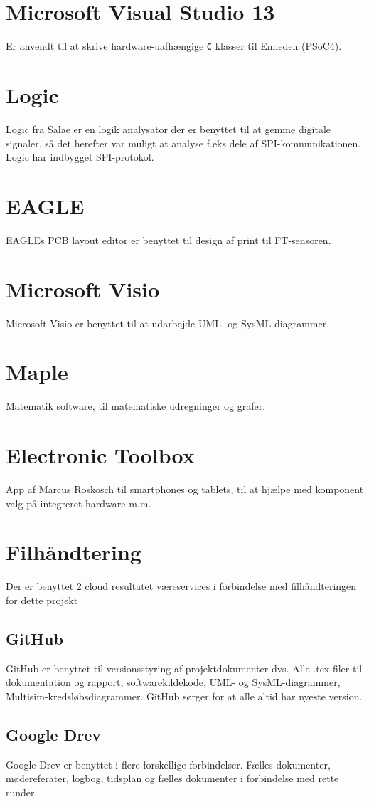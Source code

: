 \section{Microsoft Visual Studio 13}
Er anvendt til at skrive hardware-uafhængige \verb+C+ klasser til Enheden (PSoC4).

\section{Logic}
Logic fra Salae er en logik analysator der er benyttet til at gemme digitale signaler, så det herefter var muligt at analyse f.eks dele af SPI-kommunikationen. Logic har indbygget SPI-protokol.

\section{EAGLE}
EAGLEs PCB layout editor er benyttet til design af print til FT-sensoren.

\section{Microsoft Visio}
Microsoft Visio er benyttet til at udarbejde UML- og SysML-diagrammer. 

\section{Maple}
Matematik software, til matematiske udregninger og grafer.

\section{Electronic Toolbox}
App af Marcus Roskosch til smartphones og tablets, til at hjælpe med komponent valg på integreret hardware m.m. 

\section{Filhåndtering}
Der er benyttet 2 cloud resultatet væreservices i forbindelse med filhåndteringen for dette projekt

\subsection{GitHub}
GitHub er benyttet til versionsstyring af projektdokumenter dvs. Alle .tex-filer til dokumentation og rapport, softwarekildekode, UML- og SysML-diagrammer, Multisim-kredsløbsdiagrammer. GitHub sørger for at alle altid har nyeste version. 

\subsection{Google Drev}
Google Drev er benyttet i flere forskellige forbindelser. Fælles dokumenter, mødereferater, logbog, tidsplan og fælles dokumenter i forbindelse med rette runder.